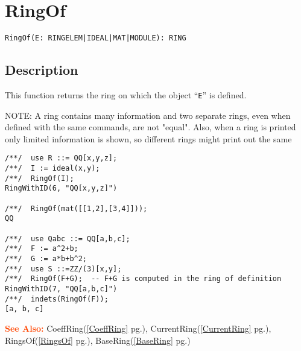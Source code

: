 \documentclass[a4paper]{mybook}
\newenvironment{command}{}{} %
\newcommand\SeeAlso{\par\textcolor{OrangeRed}{\textbf{\large See Also: }}}
\begin{document}
\section{RingOf}
\label{RingOf}
\begin{command} %


\begin{Verbatim}[label=syntax, rulecolor=\color{MidnightBlue},
frame=single]
RingOf(E: RINGELEM|IDEAL|MAT|MODULE): RING
\end{Verbatim}


\subsection*{Description}

This function returns the ring on which the object ``\verb&E&'' is defined.
\par 
NOTE: A ring contains many information and two separate rings, even when
defined with the same commands, are not "equal".  Also, when a ring
is printed only limited information is shown, so different rings might
print out the same
\begin{Verbatim}[label=example, rulecolor=\color{PineGreen}, frame=single]
/**/  use R ::= QQ[x,y,z];
/**/  I := ideal(x,y);
/**/  RingOf(I);
RingWithID(6, "QQ[x,y,z]")

/**/  RingOf(mat([[1,2],[3,4]]));
QQ

/**/  use Qabc ::= QQ[a,b,c];
/**/  F := a^2+b;
/**/  G := a*b+b^2;
/**/  use S ::=ZZ/(3)[x,y];
/**/  RingOf(F+G);  -- F+G is computed in the ring of definition
RingWithID(7, "QQ[a,b,c]")
/**/  indets(RingOf(F));
[a, b, c]
\end{Verbatim}


\SeeAlso %
  CoeffRing(\ref{CoeffRing} pg.\pageref{CoeffRing}), 
    CurrentRing(\ref{CurrentRing} pg.\pageref{CurrentRing}), 
    RingsOf(\ref{RingsOf} pg.\pageref{RingsOf}), 
    BaseRing(\ref{BaseRing} pg.\pageref{BaseRing})
\end{command} %
\end{document}
